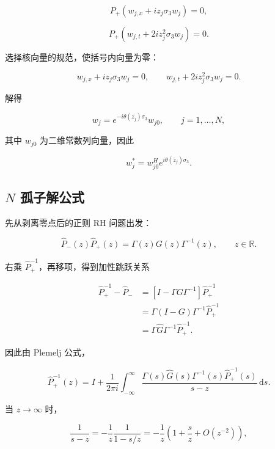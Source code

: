 \documentclass[
    lang=cn,
    scheme=chinese,
    mode=simple,
    device=normal,
    color=blue,
    math=cm,
    thmcnt=section,
    12pt,
    nowatermark
]{elegantbook}
\begin{document}
\[
    P_+\left(w_{j,x}+iz_j\sigma_3w_j\right)=0,
\]

\[
    P_+\left(w_{j,t}+2iz_j^2\sigma_3w_j\right)=0.
\]

选择核向量的规范，使括号内向量为零：

\[
    w_{j,x}+iz_j\sigma_3w_j=0,
    \qquad
    w_{j,t}+2iz_j^2\sigma_3w_j=0.
\]

解得

\begin{equation}
    w_j
    =
    e^{-i\theta(z_j)\sigma_3}w_{j0},
    \qquad
    j=1,\ldots,N,
    \tag{5.4.5}
    \label{eq:5.4.5}
\end{equation}

其中 $w_{j0}$ 为二维常数列向量，因此

\begin{equation}
    w_j^*
    =
    w_{j0}^He^{i\theta(\bar z_j)\sigma_3}.
    \tag{5.4.6}
    \label{eq:5.4.6}
\end{equation}

\subsection{\texorpdfstring{$N$}{N} 孤子解公式}

先从剥离零点后的正则 RH 问题出发：

\[
    \widehat P_-(z)\widehat P_+(z)
    =
    \Gamma(z)G(z)\Gamma^{-1}(z),
    \qquad z\in\mathbb R.
\]

右乘 $\widehat P_+^{-1}$，再移项，得到加性跳跃关系

\[
    \begin{aligned}
        \widehat P_+^{-1}-\widehat P_-
        & =
        \left[I-\Gamma G\Gamma^{-1}\right]\widehat P_+^{-1} \\
        & =
        \Gamma(I-G)\Gamma^{-1}\widehat P_+^{-1} \\
        & =
        \Gamma\widehat G\Gamma^{-1}\widehat P_+^{-1}.
    \end{aligned}
\]

因此由 Plemelj 公式，

\[
    \widehat P_+^{-1}(z)
    =
    I+
    \dfrac{1}{2\pi i}
    \int_{-\infty}^{\infty}
    \dfrac{
        \Gamma(s)\widehat G(s)\Gamma^{-1}(s)\widehat P_+^{-1}(s)
    }{s-z}
    \,\mathrm ds.
\]

当 $z\to\infty$ 时，

\[
    \dfrac{1}{s-z}
    =
    -\dfrac{1}{z}\dfrac{1}{1-s/z}
    =
    -\dfrac{1}{z}
    \left(1+\dfrac{s}{z}+O(z^{-2})\right),
\]
\end{document}
